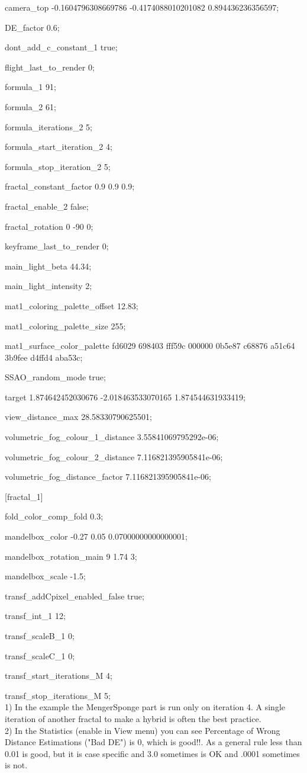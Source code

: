 camera\_top -0.1604796308669786 -0.4174088010201082 0.894436236356597;

DE\_factor 0.6;

dont\_add\_c\_constant\_1 true;

flight\_last\_to\_render 0;

formula\_1 91;

formula\_2 61;

formula\_iterations\_2 5;

formula\_start\_iteration\_2 4;

formula\_stop\_iteration\_2 5;

fractal\_constant\_factor 0.9 0.9 0.9;

fractal\_enable\_2 false;

fractal\_rotation 0 -90 0;

keyframe\_last\_to\_render 0;

main\_light\_beta 44.34;

main\_light\_intensity 2;

mat1\_coloring\_palette\_offset 12.83;

mat1\_coloring\_palette\_size 255;

mat1\_surface\_color\_palette fd6029 698403 fff59c 000000 0b5e87 c68876
a51c64 3b9fee d4ffd4 aba53c;

SSAO\_random\_mode true;

target 1.874642452030676 -2.018463533070165 1.874544631933419;

view\_distance\_max 28.58330790625501;

volumetric\_fog\_colour\_1\_distance 3.55841069795292e-06;

volumetric\_fog\_colour\_2\_distance 7.116821395905841e-06;

volumetric\_fog\_distance\_factor 7.116821395905841e-06;

{[}fractal\_1{]}

fold\_color\_comp\_fold 0.3;

mandelbox\_color -0.27 0.05 0.07000000000000001;

mandelbox\_rotation\_main 9 1.74 3;

mandelbox\_scale -1.5;

transf\_addCpixel\_enabled\_false true;

transf\_int\_1 12;

transf\_scaleB\_1 0;

transf\_scaleC\_1 0;

transf\_start\_iterations\_M 4;

transf\_stop\_iterations\_M 5;\\[2\baselineskip]1) In the example the
MengerSponge part is run only on iteration 4. A single iteration of
another fractal to make a hybrid is often the best
practice.\\[2\baselineskip]2) In the Statistics (enable in View menu)
you can see Percentage of Wrong Distance Estimations ("Bad DE") is 0,
which is good!!. As a general rule less than 0.01 is good, but it is
case specific and 3.0 sometimes is OK and .0001 sometimes is not.

